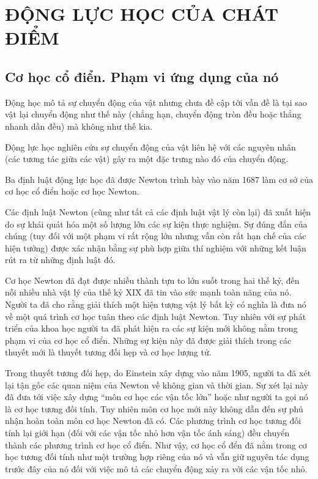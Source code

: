

\chapter{ĐỘNG LỰC HỌC CỦA CHÁT ĐIỂM}\label{chap:2}

\section{Cơ học cổ điển. Phạm vi ứng dụng của nó}\label{sec:2_1}

Động học mô tả sự chuyển động của vật nhưng chưa đề cập tới vấn đề là tại sao vật lại chuyển động như thế này (chẳng hạn, chuyển động tròn đều hoặc thẳng nhanh dần đều) mà không như thế kia.

Động lực học nghiên cứu sự chuyển động của vật liên hệ với các nguyên nhân (các tương tác giữa các vật) gây ra một đặc trưng nào đó của chuyển động.

Ba định luật động lực học đã được Newton trình bày vào năm 1687 làm cơ sở của cơ học cổ điển hoặc cơ học Newton.

Các định luật Newton (cũng như tất cả các định luật vật lý còn lại) đã xuất hiện do sự khái quát hóa một số lượng lớn các sự kiện thực nghiệm. Sự đúng đắn của chúng (tuy đối với một phạm vi rất rộng lớn nhưng vẫn còn rất hạn chế của các hiện tưởng) được xác nhận bằng sự phù hợp giữa thí nghiệm với những kết luận rút ra từ những định luật đó.

Cơ học Newton đã đạt được nhiều thành tựu to lớn suốt trong hai thế kỷ, đến nỗi nhiều nhà vật lý của thế kỷ XIX đã tin vào sức mạnh toàn năng của nó. Người ta đã cho rằng giải thích một hiện tượng vật lý bất kỳ có nghĩa là đưa nó về một quá trình cơ học tuân theo các định luật Newton. Tuy nhiên với sự phát triển của khoa học người ta đã phát hiện ra các sự kiện mới không nằm trong phạm vi của cơ học cổ điển. Những sự kiện này đã được giải thích trong các thuyết mới là thuyết tương đối hẹp và cơ học lượng tử.

Trong thuyết tương đối hẹp, do Einstein xây dựng vào năm 1905, người ta đã xét lại tận gốc các quan niệm của Newton về không gian và thời gian. Sự xét lại này đã đưa tới việc xây dựng ``môn cơ học các vận tốc lớn'' hoặc như người ta gọi nó là cơ học tương đối tính. Tuy nhiên môn cơ học mới này không dẫn đến sự phủ nhận hoàn toàn môn cơ học Newton đã có. Các phương trình cơ học tương đối tính lại giới hạn (đối với các vận tốc nhỏ hơn vận tốc ánh sáng) đều chuyển thành các phương trình cơ học cổ điển. Như vậy, cơ học cổ đển đã nằm trong cơ học tương đối tính như một trường hợp riêng của nó và vẫn giữ nguyên tác dụng trước đây của nó đối với việc mô tả các chuyển động xảy ra với các vận tốc nhỏ.

